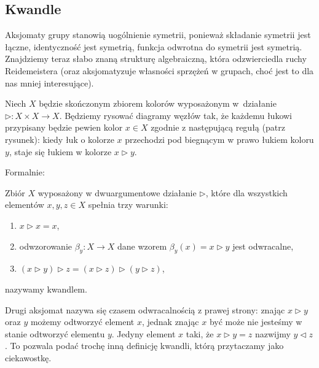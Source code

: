 \subsection{Kwandle}
Aksjomaty grupy stanowią uogólnienie symetrii, ponieważ składanie symetrii jest łączne, identyczność jest symetrią, funkcja odwrotna do symetrii jest symetrią.
Znajdziemy teraz słabo znaną strukturę algebraiczną, która odzwierciedla ruchy Reidemeistera (oraz aksjomatyzuje własności sprzężeń w grupach, choć jest to dla nas mniej interesujące).
%

Niech $X$ będzie skończonym zbiorem kolorów wyposażonym w~działanie $\triangleright \colon X \times X \to X$.
Będziemy rysować diagramy węzłów tak, że każdemu łukowi przypisany będzie pewien kolor $x \in X$ zgodnie z następującą regułą (patrz rysunek): kiedy łuk o kolorze $x$ przechodzi pod biegnącym w prawo łukiem koloru $y$, staje się łukiem w kolorze $x \triangleright y$.

\begin{comment}
\[
    \LargeMinusCrossingQuandle
\]
\end{comment}

Formalnie:

\begin{definition}[kwandel]
\label{def:quandle}%
%
    Zbiór $X$ wyposażony w dwuargumentowe działanie $\triangleright$, które dla wszystkich elementów $x, y, z \in X$ spełnia trzy warunki:
    \begin{enumerate}
        \item $x \triangleright x = x$,
        \item odwzorowanie $\beta_y \colon X \to X$ dane wzorem $\beta_y(x) = x \triangleright y$ jest odwracalne,
        \item $(x \triangleright y) \triangleright z = (x \triangleright z) \triangleright (y \triangleright z)$,
    \end{enumerate}
    nazywamy kwandlem.
\end{definition}

Drugi aksjomat nazywa się czasem odwracalnością z prawej strony: znając $x \triangleright y$ oraz $y$ możemy odtworzyć element $x$, jednak znając $x$ być może nie jesteśmy w stanie odtworzyć elementu $y$.
Jedyny element $x$ taki, że $x \triangleright y = z$ nazwijmy $y \triangleleft z$.
To pozwala podać trochę inną definicję kwandli, którą przytaczamy jako ciekawostkę.

